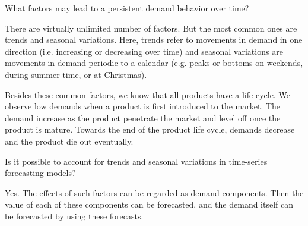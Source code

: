 \begin{exercise}
What factors may lead to a persistent demand behavior over time?



  \begin{solution}
    There are virtually unlimited number of factors. But the most common ones are trends and seasonal variations. Here, trends refer to movements in demand in one direction (i.e. increasing or decreasing over time) and seasonal variations are movements in demand periodic to a calendar (e.g. peaks or bottoms on weekends, during summer time, or at Christmas).
    
    Besides these common factors, we know that all products have a life cycle. We observe low demands when a product is first introduced to the market. The demand increase as the product penetrate the market and level off once the product is mature. Towards the end of the product life cycle, demands decrease and the product die out eventually. 
      \end{solution}
\end{exercise}


\begin{exercise}
Is it possible to account for trends and seasonal variations in time-series forecasting models?

   
  \begin{solution}
   Yes. The effects of such factors can be regarded as demand components. Then the value of each of these components can be forecasted, and the demand itself can be forecasted by using these forecasts. 
     \end{solution}
\end{exercise}
     

